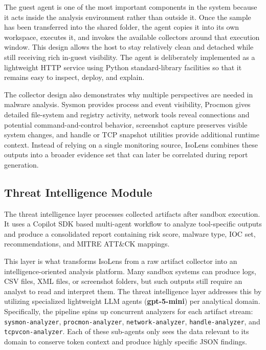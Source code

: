 \documentclass[a4paper,12pt,oneside]{report}
\begin{document}
\par

\par

The guest agent is one of the most important components in the system because it acts inside the analysis environment rather than outside it. Once the sample has been transferred into the shared folder, the agent copies it into its own workspace, executes it, and invokes the available collectors around that execution window. This design allows the host to stay relatively clean and detached while still receiving rich in-guest visibility. The agent is deliberately implemented as a lightweight HTTP service using Python standard-library facilities so that it remains easy to inspect, deploy, and explain.

\par

\par

The collector design also demonstrates why multiple perspectives are needed in malware analysis. Sysmon provides process and event visibility, Procmon gives detailed file-system and registry activity, network tools reveal connections and potential command-and-control behavior, screenshot capture preserves visible system changes, and handle or TCP snapshot utilities provide additional runtime context. Instead of relying on a single monitoring source, IsoLens combines these outputs into a broader evidence set that can later be correlated during report generation.

\subsection{Threat Intelligence Module}
The threat intelligence layer processes collected artifacts after sandbox execution. It uses a Copilot SDK based multi-agent workflow to analyze tool-specific outputs and produce a consolidated report containing risk score, malware type, IOC set, recommendations, and MITRE ATT\&CK mappings.

\par

\par

This layer is what transforms IsoLens from a raw artifact collector into an intelligence-oriented analysis platform. Many sandbox systems can produce logs, CSV files, XML files, or screenshot folders, but such outputs still require an analyst to read and interpret them. The threat intelligence layer addresses this by utilizing specialized lightweight LLM agents (\textbf{gpt-5-mini}) per analytical domain. Specifically, the pipeline spins up concurrent analyzers for each artifact stream: \texttt{sysmon-analyzer}, \texttt{procmon-analyzer}, \texttt{network-analyzer}, \texttt{handle-analyzer}, and \texttt{tcpvcon-analyzer}. Each of these sub-agents only sees the data relevant to its domain to conserve token context and produce highly specific JSON findings. 
\end{document}
